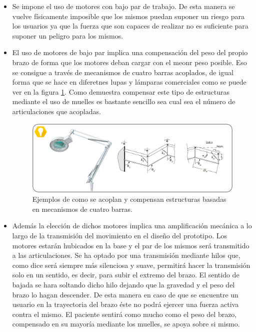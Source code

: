 \begin{itemize}
    \item Se impone el uso de motores con bajo par de trabajo. De esta manera se vuelve físicamente imposible que los mismos puedan suponer un riesgo para los usuarios ya que la fuerza que son capaces de realizar no es suficiente para suponer un peligro para los mismos.
    \item El uso de motores de bajo par implica una compensación del peso del propio brazo de forma que los motores deban cargar con el meonr peso posible. Eso se consigue a través de mecanismos de cuatro barras acoplados, de igual forma que se hace en diferetnes lupas y lámparas comerciales como se puede ver en la figura \ref{fig:PuntoPartida:CuatroBarras}. Como demuestra \cite{Rahman_asimple} compensar este tipo de estructuras mediante el uso de muelles es bastante sencillo sea cual sea el número de articulaciones que acopladas.

    \begin{figure}[H]
           \centering
           \includegraphics[width=1\textwidth]{figuras/Imagenes_PuntoPartida/CuatroBarras.jpg}
           \caption{Ejemplos de como se acoplan y compensan estructuras basadas en mecanismos de cuatro barras.}
           \label{fig:PuntoPartida:CuatroBarras}
    \end{figure}

    \item Además la elección de dichos motores implica una amplificación mecánica a lo largo de la transmisión del movimiento en el diseño del prototipo. Los motores estarán hubicados en la base y el par de los mismos será transmitido a las articulaciones. Se ha optado por una transmisión mediante hilos que, como dice \cite{LeonardoCodice} será siempre más silenciosa y suave, permitirá hacer la transmisión solo en un sentido, es decir, para subir el extremo del brazo. El sentido de bajada se hara soltando dicho hilo dejando que la gravedad y el peso del brazo lo hagan descender. De esta manera en caso de que se encuentre un usuario en la trayectoria del brazo éste no podrá ejercer una fuerza activa contra el mismo. El paciente sentirá como mucho como el peso del brazo, compensado en su mayoría mediante los muelles, se apoya sobre si mismo.


\end{itemize}
